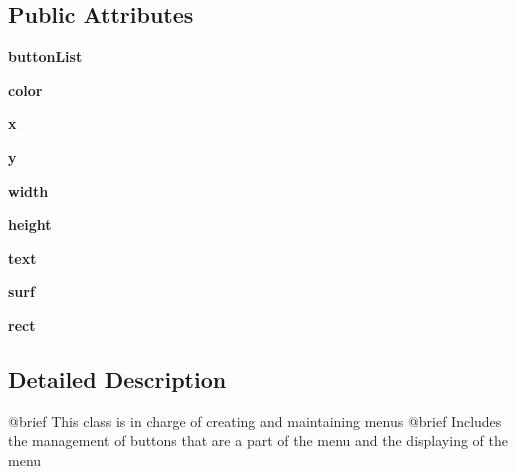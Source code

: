 \subsection*{Public Attributes}
\begin{DoxyCompactItemize}
\item 
\mbox{\label{class_menu_1_1gui__menu_a6e5709cfb3fb78a1a05f232bf6b0789f}} 
{\bfseries button\+List}
\item 
\mbox{\label{class_menu_1_1gui__menu_ab80828defb1074b06f1dc3cb5797a111}} 
{\bfseries color}
\item 
\mbox{\label{class_menu_1_1gui__menu_a0dc7329c1d7972fb3698ded200594687}} 
{\bfseries x}
\item 
\mbox{\label{class_menu_1_1gui__menu_a5661e8b51d0c4a1e50045de140106858}} 
{\bfseries y}
\item 
\mbox{\label{class_menu_1_1gui__menu_a65e92e5db0d73ddcde316b558099d9ed}} 
{\bfseries width}
\item 
\mbox{\label{class_menu_1_1gui__menu_a22e68471db1fc8c012b2dbfe1b7afe3e}} 
{\bfseries height}
\item 
\mbox{\label{class_menu_1_1gui__menu_aa89d3bed1efbd66a65af0d1272d6948c}} 
{\bfseries text}
\item 
\mbox{\label{class_menu_1_1gui__menu_a110b78f39e4953aaf214aab3fd16c7a8}} 
{\bfseries surf}
\item 
\mbox{\label{class_menu_1_1gui__menu_a2717f1abb37a43a086be3fec4fbb4750}} 
{\bfseries rect}
\end{DoxyCompactItemize}


\subsection{Detailed Description}
\begin{DoxyVerb}@brief This class is in charge of creating and maintaining menus
@brief Includes the management of buttons that are a part of the menu and the displaying of the menu
\end{DoxyVerb}
 

